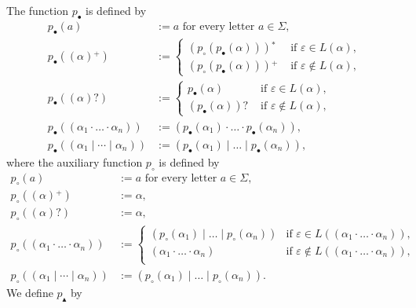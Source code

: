 \documentclass[a4paper,11pt, svgnames,titlepage]{article}
\newcommand{\rxp}{{^\mathtt{+}}}
\newcommand{\rxs}{{^\mathtt{*}}}
\newcommand{\rxo}{\mathtt{?}}
\newcommand{\rxc}{\cdot}
\DeclareMathOperator{\ror}{\mathtt{|}}
\newcommand{\emptyword}{\varepsilon}
\newcommand{\df}{:=}
\newcommand{\wpnffun}{p_{\bullet}}
\newcommand{\wpnfhfun}{p_{\circ}}
\newcommand{\pnfupfun}{p_{\blacktriangle}}
\newcommand{\wpnf}[1]{\wpnffun{\left(#1\right)}}
\newcommand{\wpnfh}[1]{\wpnfhfun{\left(#1\right)}}
\begin{document}
The function $\wpnffun$ is defined by
\begin{align*}
	\wpnf{a}&\df a \text{ for every letter $a\in \Sigma$,}\\
	\wpnf{(\alpha)\rxp}
		&\df \begin{cases}
			(\wpnfh{\wpnf{\alpha}})\rxs & \text{ if $\emptyword\in L(\alpha)$,}\\
			(\wpnfh{\wpnf{\alpha}})\rxp & \text{ if $\emptyword\notin L(\alpha)$,}
		\end{cases}\\
	\wpnf{(\alpha)\rxo}
		&\df \begin{cases}
			\wpnf{\alpha} & \text{ if $\emptyword\in L(\alpha)$,}\\
			(\wpnf{\alpha})\rxo & \text{ if $\emptyword\notin L(\alpha)$,}
		\end{cases}\\
	\wpnf{(\alpha_1\rxc \ldots \rxc \alpha_n)}
		&\df (\wpnf{\alpha_1}\rxc \ldots \rxc \wpnf{\alpha_n}),\\
	\wpnf{(\alpha_1\ror \cdots \ror \alpha_n)}
		&\df (\wpnf{\alpha_1} \ror \ldots \ror \wpnf{\alpha_n}),
\end{align*}
where the auxiliary function $\wpnfhfun$ is defined by 
\begin{align*}
	\wpnfh{a}&\df a\text{ for every letter $a\in \Sigma$,}\\
	\wpnfh{(\alpha)\rxp}
		&\df \alpha,\\
	\wpnfh{(\alpha)\rxo}
		&\df \alpha,\\
	\wpnfh{(\alpha_1\rxc \ldots \rxc \alpha_n)}
		&\df \begin{cases}
			(\wpnfh{\alpha_1}\ror \ldots \ror \wpnfh{\alpha_n}) & \text{if $\emptyword\in L((\alpha_1\rxc \ldots \rxc \alpha_n))$},\\
			(\alpha_1\rxc \ldots \rxc \alpha_n) & \text{if $\emptyword\notin L((\alpha_1\rxc \ldots \rxc \alpha_n))$},\\
		\end{cases}\\
	\wpnfh{(\alpha_1\ror \cdots \ror \alpha_n)}
		&\df (\wpnfh{\alpha_1}\ror \ldots \ror \wpnfh{\alpha_n}).
\end{align*}
We define $\pnfupfun$ by
\end{document}
